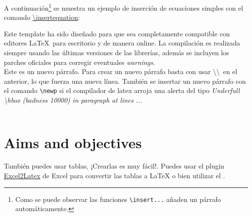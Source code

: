 
	A continuación\footnote{Como se puede observar las funciones \texttt{\textbackslash insert...} añaden un párrafo automáticamente.} se muestra un ejemplo de inserción de ecuaciones simples con el comando \href{https://latex.ppizarror.com/informe.html#hlp-formulae}{\textbackslash insertequation}:


	Este template ha sido diseñado para que sea completamente compatible con editores \LaTeX\ para escritorio y de manera online. La compilación es realizada siempre usando las últimas versiones de las librerías, además se incluyen los parches oficiales para corregir eventuales \textit{warnings}. \\

	Este es un nuevo párrafo. Para crear un nuevo párrafo basta con usar \textbackslash\textbackslash\ en el anterior, lo que fuerza una nueva línea. También se insertar un nuevo párrafo con el comando \texttt{\textbackslash newp} si el compilador de latex arroja una alerta del tipo \textit{Underfull \textbackslash hbox (badness 10000) in paragraph at lines ...} \\

	\lipsum[4] \\

	\lipsum[11]

\section{Aims and objectives}

También puedes usar tablas, ¡Crearlas es muy fácil!. Puedes usar el plugin \href{https://www.ctan.org/tex-archive/support/excel2latex}{Excel2Latex} \cite{excel2latex} de Excel para convertir las tablas a \LaTeX\xspace o bien utilizar el  \cite{tablesgenerator}.

